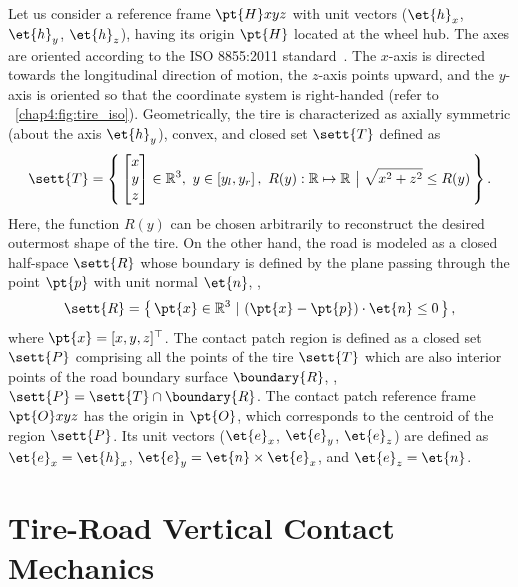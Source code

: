 Let us consider a reference frame $\pt{H}xyz$ with unit vectors ($\et{h}_x$, $\et{h}_y$, $\et{h}_z$),  having its origin $\pt{H}$ located at the wheel hub. The axes are oriented according to the ISO 8855:2011 standard~\cite{iso88552011}. The $x$-axis is directed towards the longitudinal direction of motion, the $z$-axis points upward, and the $y$-axis is oriented so that the coordinate system is right-handed (refer to \figurename~\ref{chap4:fig:tire_iso}).  Geometrically, the tire is characterized as axially symmetric (about the axis $\et{h}_y$), convex, and closed set $\sett{T}$ defined as
%
\begin{equation}
  \sett{T} = \left\{ \, \begin{bmatrix} x\\ y\\ z \end{bmatrix} \in \mathbb{R}^3, ~ y \in \left[ y_l, y_r \right], ~ R(y):\mathbb{R} \mapsto \mathbb{R} ~\big|~ \sqrt{x^2+z^2} \leq R(y) \, \right\}.
\end{equation}
%
Here, the function $R(y)$ can be chosen arbitrarily to reconstruct the desired outermost shape of the tire. On the other hand, the road is modeled as a closed half-space $\sett{R}$ whose boundary is defined by the plane passing through the point $\pt{p}$ with unit normal $\et{n}$, \ie{},
%
\begin{equation}
  \sett{R} = \left\{ \, \pt{x}\in\mathbb{R}^3 ~|~ (\pt{x}-\pt{p})\cdot\et{n} \leq 0 \, \right\},
\end{equation}
%
where $\pt{x} = [x,y,z]^\top$. The contact patch region is defined as a closed set $\sett{P}$ comprising all the points of the tire $\sett{T}$ which are also interior points of the road boundary surface $\boundary{R}$, \ie{}, $\sett{P} = \sett{T} \cap \boundary{R}$. The contact patch reference frame $\pt{O}xyz$ has the origin in $\pt{O}$, which corresponds to the centroid of the region $\sett{P}$. Its unit vectors ($\et{e}_x$, $\et{e}_y$, $\et{e}_z$) are defined as $\et{e}_x = \et{h}_x$, $\et{e}_y = \et{n} \times \et{e}_x$, and $\et{e}_z = \et{n}$.


\section{Tire-Road Vertical Contact Mechanics}
\label{chap4:sec:vertical_contact}

